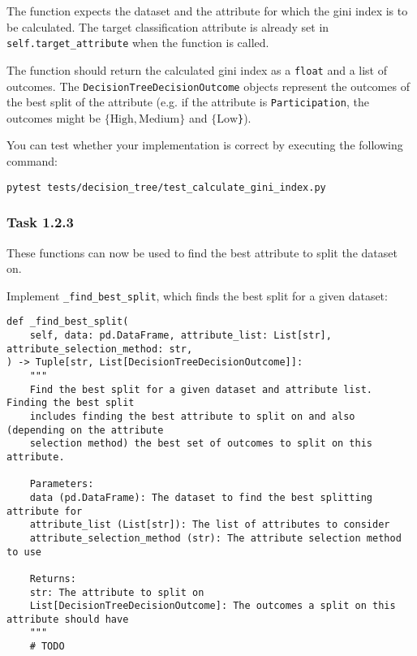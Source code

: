 \documentclass[
english,
smallborders
]{i6prcsht}
\begin{document}
\vspace*{0.1cm}

The function expects the dataset and the attribute for which the gini index is to be calculated. The target classification attribute is already set in \texttt{self.target\_attribute} when the function is called.

The function should return the calculated gini index as a \texttt{float} and a list of outcomes. The \texttt{DecisionTreeDecisionOutcome} objects represent the outcomes of the best split of the attribute (e.g. if the attribute is \texttt{Participation}, the outcomes might be \texttt{$\{\text{High}, \text{Medium}\}$} and \texttt{$\{\text{Low}$\}}).

You can test whether your implementation is correct by executing the following command:

\vspace*{0.3cm}

\begin{lstlisting}
pytest tests/decision_tree/test_calculate_gini_index.py
\end{lstlisting}

\vspace*{0.1cm}

\subsubsection*{Task 1.2.3}

These functions can now be used to find the best attribute to split the dataset on.

Implement \texttt{\_find\_best\_split}, which finds the best split for a given dataset:

\vspace*{0.3cm}

\newpage

\begin{lstlisting}
def _find_best_split(
	self, data: pd.DataFrame, attribute_list: List[str], attribute_selection_method: str,
) -> Tuple[str, List[DecisionTreeDecisionOutcome]]:
	"""
	Find the best split for a given dataset and attribute list. Finding the best split
	includes finding the best attribute to split on and also (depending on the attribute
	selection method) the best set of outcomes to split on this attribute.

	Parameters:
	data (pd.DataFrame): The dataset to find the best splitting attribute for
	attribute_list (List[str]): The list of attributes to consider
	attribute_selection_method (str): The attribute selection method to use

	Returns:
	str: The attribute to split on
	List[DecisionTreeDecisionOutcome]: The outcomes a split on this attribute should have
	"""
	# TODO
\end{lstlisting}
\end{document}
